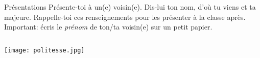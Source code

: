 \begin{frame}{Présentations}
  Présente-toi à un(e) voisin(e).
  Dis-lui ton \alert{nom}, d'\alert{où} tu viens et ta \alert{majeure}.
  Rappelle-toi ces renseignements pour les présenter à la classe après.
  \alert{Important}: écris le \emph{prénom} de ton/ta voisin(e) sur un petit papier.
  \begin{columns}
      \begin{center}
        \texttt{[image: politesse.jpg]}
      \end{center}
  \end{columns}
\end{frame}